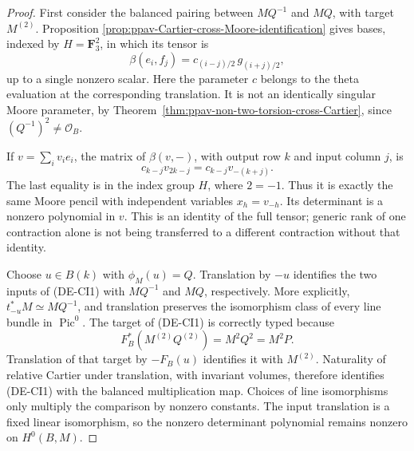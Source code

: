 \begin{proof}
First consider the balanced pairing between \(MQ^{-1}\) and
\(MQ\), with target \(M^{(2)}\).  Proposition
\ref{prop:ppav-Cartier-cross-Moore-identification} gives bases,
indexed by \(H=\mathbf F_3^2\), in which its tensor is
\[
 \beta(e_i,f_j)=c_{(i-j)/2}\,g_{(i+j)/2},              \tag{DE-CI2}
\]
up to a single nonzero scalar.  Here the parameter \(c\)
belongs to the theta evaluation at the corresponding translation.
It is not an identically singular Moore parameter, by
Theorem~\ref{thm:ppav-non-two-torsion-cross-Cartier}, since
\((Q^{-1})^2\ne\mathcal O_B\).

If \(v=\sum_i v_i e_i\), the matrix of \(\beta(v,-)\),
with output row \(k\) and input column \(j\), is
\[
             c_{k-j}v_{2k-j}=c_{k-j}v_{-(k+j)}.
                                                        \tag{DE-CI3}
\]
The last equality is in the index group \(H\), where \(2=-1\).
Thus it is exactly the same Moore pencil with independent
variables \(x_h=v_{-h}\).  Its determinant is a nonzero
polynomial in \(v\).  This is an identity of the full tensor;
generic rank of one contraction alone is not being transferred
to a different contraction without that identity.

Choose \(u\in B(k)\) with \(\phi_M(u)=Q\).  Translation
by \(-u\) identifies the two inputs of (DE-CI1) with
\(MQ^{-1}\) and \(MQ\), respectively.  More explicitly,
\(t_{-u}^*M\simeq MQ^{-1}\), and translation preserves the
isomorphism class of every line bundle in \(\operatorname{Pic}^0\).
The target of (DE-CI1) is correctly typed because
\[
 F_B^*(M^{(2)}Q^{(2)})=M^2Q^2=M^2P.
\]
Translation of that target by \(-F_B(u)\) identifies it with
\(M^{(2)}\).  Naturality of relative Cartier under translation,
with invariant volumes, therefore identifies (DE-CI1) with
the balanced multiplication map.  Choices of line isomorphisms
only multiply the comparison by nonzero constants.  The input
translation is a fixed linear isomorphism, so the nonzero
determinant polynomial remains nonzero on \(H^0(B,M)\).
\end{proof}

